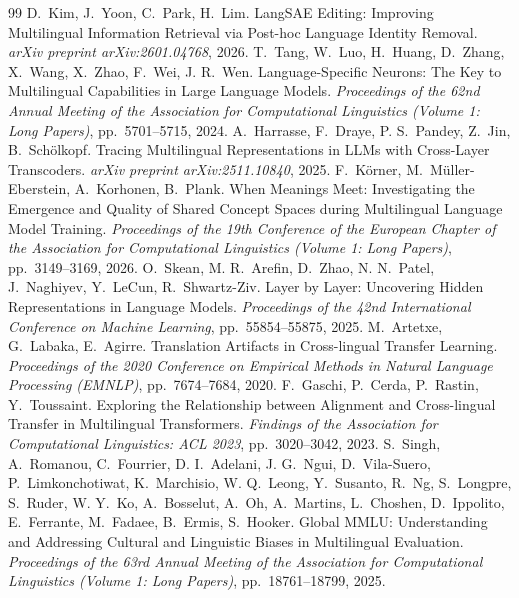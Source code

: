 \documentclass[11pt,a4paper]{article}
\begin{document}
\begin{thebibliography}{99}
D.~Kim, J.~Yoon, C.~Park, H.~Lim. LangSAE Editing: Improving Multilingual Information Retrieval via Post-hoc Language Identity Removal. \emph{arXiv preprint arXiv:2601.04768}, 2026.
T.~Tang, W.~Luo, H.~Huang, D.~Zhang, X.~Wang, X.~Zhao, F.~Wei, J. R.~Wen. Language-Specific Neurons: The Key to Multilingual Capabilities in Large Language Models. \emph{Proceedings of the 62nd Annual Meeting of the Association for Computational Linguistics (Volume 1: Long Papers)}, pp.~5701--5715, 2024.
A.~Harrasse, F.~Draye, P. S.~Pandey, Z.~Jin, B.~Sch\"olkopf. Tracing Multilingual Representations in LLMs with Cross-Layer Transcoders. \emph{arXiv preprint arXiv:2511.10840}, 2025.
F.~K\"orner, M.~M\"uller-Eberstein, A.~Korhonen, B.~Plank. When Meanings Meet: Investigating the Emergence and Quality of Shared Concept Spaces during Multilingual Language Model Training. \emph{Proceedings of the 19th Conference of the European Chapter of the Association for Computational Linguistics (Volume 1: Long Papers)}, pp.~3149--3169, 2026.
O.~Skean, M. R.~Arefin, D.~Zhao, N. N.~Patel, J.~Naghiyev, Y.~LeCun, R.~Shwartz-Ziv. Layer by Layer: Uncovering Hidden Representations in Language Models. \emph{Proceedings of the 42nd International Conference on Machine Learning}, pp.~55854--55875, 2025.
M.~Artetxe, G.~Labaka, E.~Agirre. Translation Artifacts in Cross-lingual Transfer Learning. \emph{Proceedings of the 2020 Conference on Empirical Methods in Natural Language Processing (EMNLP)}, pp.~7674--7684, 2020.
F.~Gaschi, P.~Cerda, P.~Rastin, Y.~Toussaint. Exploring the Relationship between Alignment and Cross-lingual Transfer in Multilingual Transformers. \emph{Findings of the Association for Computational Linguistics: ACL 2023}, pp.~3020--3042, 2023.
S.~Singh, A.~Romanou, C.~Fourrier, D. I.~Adelani, J. G.~Ngui, D.~Vila-Suero, P.~Limkonchotiwat, K.~Marchisio, W. Q.~Leong, Y.~Susanto, R.~Ng, S.~Longpre, S.~Ruder, W. Y.~Ko, A.~Bosselut, A.~Oh, A.~Martins, L.~Choshen, D.~Ippolito, E.~Ferrante, M.~Fadaee, B.~Ermis, S.~Hooker. Global MMLU: Understanding and Addressing Cultural and Linguistic Biases in Multilingual Evaluation. \emph{Proceedings of the 63rd Annual Meeting of the Association for Computational Linguistics (Volume 1: Long Papers)}, pp.~18761--18799, 2025.

\end{thebibliography}
\end{document}
